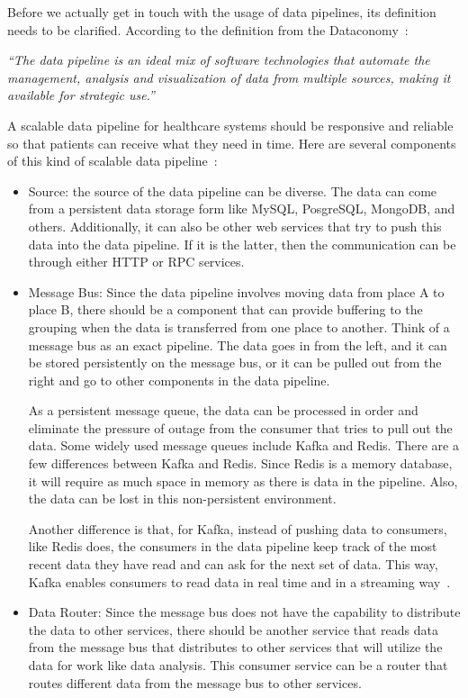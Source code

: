 Before we actually get in touch with the usage of data pipelines, its
definition needs to be clarified. According to the definition from 
the Dataconomy~\cite{pipe}:
\begin{center}
\textit{``The data pipeline is an ideal mix of software technologies that 
automate the management, analysis and visualization of data from 
multiple sources, making it available for strategic use.''}
\end{center}

A scalable data pipeline for healthcare systems should be responsive and 
reliable so that patients can receive what they need in time. Here are 
several components of this kind of scalable data pipeline~\cite{pipe}:
\begin{itemize}
	\item Source: the source of the data pipeline can be diverse. The data 
	can come from a persistent data storage form like MySQL, PosgreSQL, 
	MongoDB, and others. Additionally, it can also be other web 
	services that try
	to push this data into the data pipeline. If it is the latter, then the 
	communication can be through either HTTP or RPC services. 
	\item Message Bus: Since the data pipeline involves moving data from 
	place A to place B, there should be a component that can provide 
	buffering to the grouping when the data is transferred from one place 
	to another. Think of a message bus as an exact pipeline. The data 
	goes in from the left, and it can be stored persistently on the message 
	bus, or it can be pulled out from the right and go to other components 
	in the data pipeline.

As a persistent message queue, the data can be processed in order and 
eliminate the pressure of outage from the consumer that tries to pull out 
the data. Some widely used message queues include Kafka and Redis. 
There are a few differences between Kafka and Redis. Since Redis is a 
memory database, it will require as much space in memory as there is
data in the pipeline. Also, the data can be lost in this non-persistent 
environment.

Another difference is that, for Kafka, instead of pushing data to 
consumers, like Redis does, the consumers in the data pipeline keep 
track of the most recent data they have read and can ask for the next 
set of data. This way, Kafka enables consumers to read data in real 
time and in a streaming way~\cite{Nithin8720}.

	\item Data Router: Since the message bus does not have the capability 
	to distribute the data to other services, there should be another service 
	that reads data from the message bus that distributes to other services 
	that will utilize the data for work like data analysis. This consumer 
	service can be a router that routes different data from the message bus 
	to other services.
	

\end{itemize}
